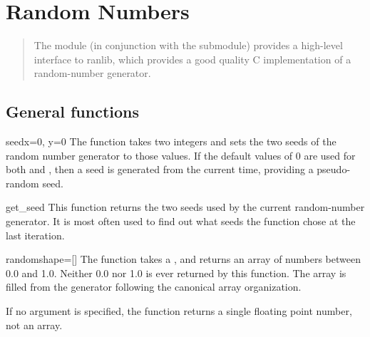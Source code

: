 \chapter{Random Numbers}
\label{cha:random-array}

\makeatletter \py@reset \makeatother

\begin{quote}
  The  module (in conjunction with the
   submodule) provides a high-level
  interface to ranlib, which provides a good quality C implementation of a
  random-number generator.
\end{quote}

\section{General functions}
\label{sec:RA:general-functions}

\begin{funcdesc}{seed}{x=0, y=0}
The  function takes two integers and sets the two seeds of the
random number generator to those values. If the default values of 0 are used
for both  and , then a seed is generated from the current time,
providing a pseudo-random seed.
\end{funcdesc}

\begin{funcdesc}{get_seed}{}
This function returns the two seeds used by the current random-number
generator. It is most often used to find out what seeds the 
function chose at the last iteration.  
\end{funcdesc}

\begin{funcdesc}{random}{shape=[]}
   The  function takes a , and returns an array of
    numbers between 0.0 and 1.0.  Neither 0.0 nor 1.0 is ever
   returned by this function.  The array is filled from the generator following
   the canonical array organization.
   
   If no argument is specified, the function returns a single floating point
   number, not an array.
   
\end{funcdesc}


